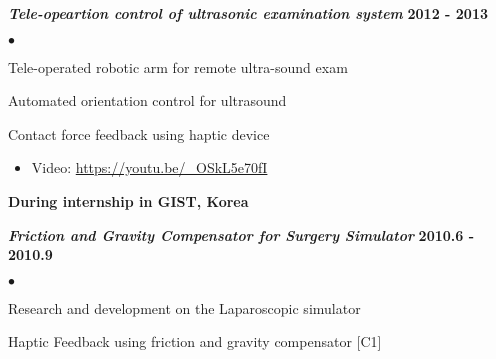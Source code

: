 \documentclass[margin,line]{res}
\newenvironment{list2}{
  \begin{list}{$\bullet$}{%
      \setlength{\itemsep}{0in}
      \setlength{\parsep}{0in} \setlength{\parskip}{0in}
      \setlength{\topsep}{0in} \setlength{\partopsep}{0in} 
      \setlength{\leftmargin}{0.2in}}}{\end{list}}
\begin{document}
\begin{resume}
\textbf{\emph { Tele-opeartion control of ultrasonic examination system}} \hfill {\bf 2012  - 2013}
\begin{list2}
\item Tele-operated robotic arm for remote ultra-sound exam
\item Automated orientation control for ultrasound
\item Contact force feedback using haptic device
\begin{itemize}
\vspace*{-.05in}
\item[\checkmark] Video: \url{https://youtu.be/_OSkL5e70fI}
\vspace*{-.05in}
\end{itemize}
\end{list2}

{\bf During internship in GIST, Korea}
 
\vspace{-.3cm}
\textbf{\emph { Friction and Gravity Compensator for Surgery Simulator }} \hfill {\bf 2010.6  - 2010.9}
\begin{list2}
\item Research and development on the Laparoscopic simulator 
\item Haptic Feedback using friction and gravity compensator [C1]
\end{list2}



\end{resume}
\end{document}
